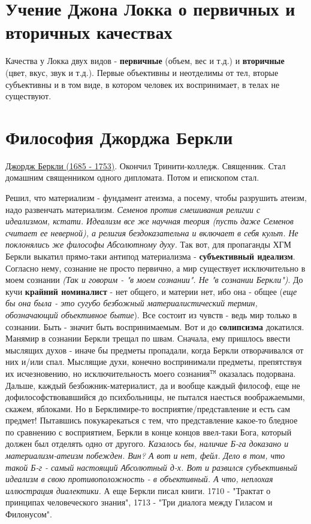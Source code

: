 \section{Учение Джона Локка о первичных и вторичных качествах}
Качества у Локка двух видов - \textbf{первичные} (объем, вес и т.д.) и \textbf{вторичные} (цвет, вкус, звук и т.д.). Первые объективны и неотделимы от тел, вторые субъективны и в том виде, в котором человек их воспринимает, в телах не существуют.
% 
\section{Философия Джорджа Беркли}
\underline{Джордж Беркли (1685 - 1753)}. Окончил Тринити-колледж. Священник. Стал домашним священником одного дипломата. Потом и епископом стал. 

Решил, что материализм - фундамент атеизма, а посему, чтобы разрушить атеизм, надо развенчать материализм. \textit{Семенов против смешивания религии с идеализмом, кстати. Идеализм  все же научная теория (пусть даже Семенов считает ее неверной), а религия бездоказательна и включает в себя культ. Не поклонялись же философы Абсолютному духу.} Так вот, для пропаганды ХГМ Беркли выкатил прямо-таки антипод материализма - \textbf{субъективный идеализм}. Согласно нему, сознание не просто первично, а мир существует исключительно в моем сознании \textit{(Так и говорим - "в моем сознании". Не "в сознании Беркли")}. До кучи \textbf{крайний номиналист} - нет общего, и материи нет, ибо она - общее (\textit{еще бы она была - это сугубо безбожный материалистический термин, обозначающий объективное бытие}). Все состоит из чувств - ведь мир только в сознании. Быть - значит быть воспринимаемым. Вот и до \textbf{солипсизма} докатился. Манямир в сознании Беркли трещал по швам. Сначала, ему пришлось ввести мыслящих духов - иначе бы предметы пропадали, когда Беркли отворачивался от них и/или спал. Мыслящие духи, конечно воспринимали предметы, препятствуя их исчезновению, но исключительность моего сознания${}^\mathtt{TM}$ оказалась подорвана. Дальше, каждый безбожник-материалист, да и вообще каждый философ, еще не дофилософствовавшийся до психбольницы, не пытался наесться воображаемыми, скажем, яблоками. Но в Берклимире-то восприятие/представление и есть сам предмет! Пытавшись покукарекаться с тем, что представление какое-то бледное по сравнению с восприятием, Беркли в конце концов ввел-таки Бога, который должен был отделять одно от другого. \textit{Казалось бы, наличие Б-га доказано и материализм-атеизм побежден. Вин? А вот и нет, фейл. Дело в том, что такой Б-г - самый настоящий Абсолютный д-х. Вот и развился субъективный идеализм в свою противоположность - в объективный. А что, неплохая иллюстрация диалектики.} А еще Беркли писал книги. 1710 - "Трактат о принципах человеческого знания",  1713 - "Три диалога между Гиласом и Филонусом".

